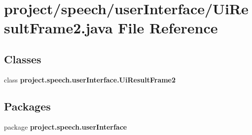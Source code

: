 \section{project/speech/user\+Interface/\+Ui\+Result\+Frame2.java File Reference}
\label{_ui_result_frame2_8java}
\subsection*{Classes}
\begin{DoxyCompactItemize}
\item 
class {\bf project.\+speech.\+user\+Interface.\+Ui\+Result\+Frame2}
\end{DoxyCompactItemize}
\subsection*{Packages}
\begin{DoxyCompactItemize}
\item 
package {\bf project.\+speech.\+user\+Interface}
\end{DoxyCompactItemize}
